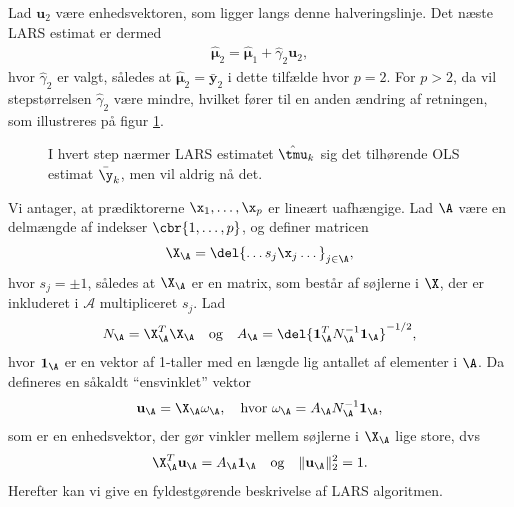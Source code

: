 %
Lad $\mathbf{u}_2$ være enhedsvektoren, som ligger langs denne halveringslinje.
Det næste LARS estimat er dermed
\begin{align*}
\widehat{\boldsymbol{\mu}}_2 = \widehat{\boldsymbol{\mu}}_1+ \widehat{\gamma}_2 \mathbf{u}_2,
\end{align*}
hvor $\widehat{\gamma}_2$ er valgt, således at $\widehat{\boldsymbol{\mu}}_2 = \bar{\textbf{y}}_2$ i dette tilfælde hvor $p = 2$. 
For \(p>2\), da vil stepstørrelsen \(\widehat{\gamma}_2\) være mindre, hvilket fører til en anden ændring af retningen, som illustreres på figur \ref{fig:lars2}.
%
\begin{figure}[H]
\centering
\scalebox{0.8}{}
\caption{I hvert step nærmer LARS estimatet \(\hat{\tmu}_k\) sig det tilhørende OLS estimat \(\bar{\y}_k\), men vil aldrig nå det.
 }\label{fig:lars2}
\end{figure}
%
Vi antager, at prædiktorerne \(\x_1, \ldots, \x_p\) er lineært uafhængige.
Lad \(\A\) være en delmængde af indekser \(\cbr{1,\ldots, p}\), og definer matricen
\begin{align}
\X_\A = \del{\dots s_j \x_j \dots}_{j \in \A}, \label{eq:lars_2.4}
\end{align}
hvor $s_j = \pm 1$, således at \(\X_\A\) er en matrix, som består af søjlerne i \(\X\), der er inkluderet i \(\mathcal{A}\) multipliceret \(s_j\).
Lad 
\begin{align}
N_\A = \X_\A^T \X_\A \quad \text{og} \quad A_\A = \del{\mathbf{1}_\A^T N_\A^{-1} \mathbf{1}_\A}^{-1/2}, \label{eq:lars_2.5}
\end{align}
hvor \(\mathbf{1}_\A\) er en vektor af 1-taller med en længde lig antallet af elementer i \(\A\).
Da defineres en såkaldt ``ensvinklet'' vektor
\begin{align}
\mathbf{u}_\A = \X_\A \omega_\A, \quad \text{hvor } \omega_\A = A_\A N_\A^{-1} \mathbf{1}_\A, \label{eq:lars_2.6}
\end{align}
som er en enhedsvektor, der gør vinkler mellem søjlerne i \(\X_\A\) lige store, dvs
\begin{align}
\X_\A^T \mathbf{u}_\A = A_\A \mathbf{1}_\A \quad \text{og} \quad \Vert \mathbf{u}_\A \Vert_2^2 = 1. \label{eq:lars_2.7}
\end{align}
Herefter kan vi give en fyldestgørende beskrivelse af LARS algoritmen.
%
